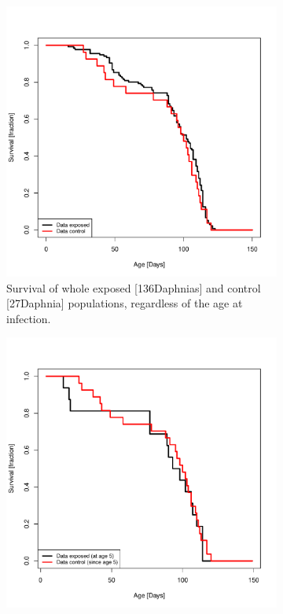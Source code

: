 \documentclass[10pt]{article}         %
\begin{document}
\begin{figure}[H]
\begin{subfigure}[b]{0.6\textwidth}
    \includegraphics[width=\textwidth]{Survival_exposed_versus_control.pdf}
    \caption{Survival of whole exposed [136Daphnias] and control [27Daphnia] populations, regardless of the age at infection.}
    \label{fig:subfigure_1}
  \end{subfigure}
  \begin{subfigure}[b]{0.6\textwidth}
    \includegraphics[width=\textwidth]{Survival_data_aai_5.pdf}

\end{subfigure}
\end{figure}
\end{document}
